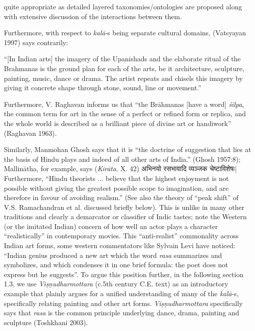 quite appropriate as detailed layered taxonomies/ontologies are proposed along with extensive discussion of the interactions between them.

Furthermore, with respect to \textsl{kalā}-s being separate cultural domains, (Vatsyayan 1997) says contrarily:

\begin{myquote}
“[In Indian arts] the imagery of the Upanishads and the elaborate ritual of the Brahmanas is the ground plan for each of the arts, be it architecture, sculpture, painting, music, dance or drama. The artist repeats and chisels this imagery by giving it concrete shape through stone, sound, line or movement.”
\end{myquote}

Furthermore, V. Raghavan informs us that “the Brāhmanas [have a word] \textsl{śilpa}, the common term for art in the sense of a perfect or refined form or replica, and the whole world is described as a brilliant piece of divine art or handiwork” (Raghavan 1963).

Similarly, Manmohan Ghosh says that it is “the doctrine of suggestion that lies at the basis of Hindu plays and indeed of all other arts of India.” (Ghosh 1957:8); Mallinātha, for example, says (\textsl{Kirāta}. X. 42) {\dev अभिनयो रसभावादि व्यञ्जक चेष्टाविशेषः|} Furthermore, “Hindu theorists ... believe that the highest enjoyment is not possible without giving the greatest possible scope to imagination, and are therefore in favour of avoiding realism.” (See also the theory of “peak shift” of V.S. Ramachandran et al. discussed briefly below). This is unlike in many other traditions and clearly a demarcator or classifier of Indic tastes; note the Western (or the imitated Indian) concern of how well an actor plays a character “realistically” in contemporary movies. This “anti-realist” commonality across Indian art forms, some western commentators like Sylvain Levi have noticed: “Indian genius produced a new art which the word \textsl{rasa} summarizes and symbolizes, and which condenses it in one brief formula: the poet does not express but he suggests”. To argue this position further, in the following section 1.3, we use \textsl{Viṣṇudharmottara} (c.5th century C.E. text) as an introductory example that plainly argues for a unified understanding of many of the \textsl{kalā}-s, specifically relating painting and other art forms. \textsl{Viṣṇudharmottara} specifically says that \textsl{rasa} is the common principle underlying dance, drama, painting and sculpture (Toshkhani 2003).

